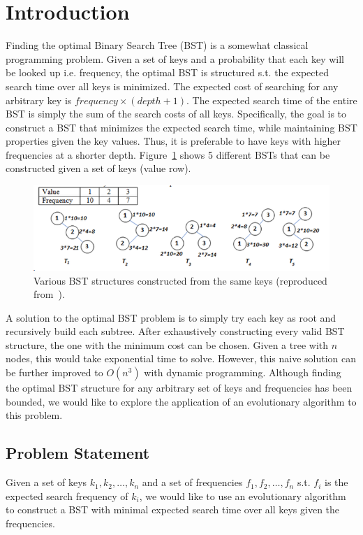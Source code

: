 
\section{Introduction}

Finding the optimal Binary Search Tree (BST) is a somewhat classical programming problem. Given a set of keys and a probability that each key will be looked up i.e. frequency, the optimal BST is structured s.t. the expected search time over all keys is minimized. The expected cost of searching for any arbitrary key is $frequency \times (depth + 1)$. The expected search time of the entire BST is simply the sum of the search costs of all keys. Specifically, the goal is to construct a BST that minimizes the expected search time, while maintaining BST properties given the key values. Thus, it is preferable to have keys with higher frequencies at a shorter depth. Figure~\ref{fig:opt-bst} shows 5 different BSTs that can be constructed given a set of keys (value row).

\begin{figure}[h]
    \centering
    \includegraphics[width=0.9\columnwidth]{figures/opt_bst.png}
    \caption{ \small Various BST structures constructed from the same keys (reproduced from~\cite{bst_figure}).}
    \label{fig:opt-bst}
\end{figure}

A solution to the optimal BST problem is to simply try each key as root and recursively build each subtree. After exhaustively constructing every valid BST structure, the one with the minimum cost can be chosen. Given a tree with $n$ nodes, this would take exponential time to solve. However, this naive solution can be further improved to $O(n^3)$ with dynamic programming. Although finding the optimal BST structure for any arbitrary set of keys and frequencies has been bounded, we would like to explore the application of an evolutionary algorithm to this problem.

\subsection{Problem Statement}

Given a set of keys $k_1,k_2,\dots,k_n$ and a set of frequencies $f_1,f_2,\dots,f_n$ s.t. $f_i$ is the expected search frequency of $k_i$, we would like to use an evolutionary algorithm to construct a BST with minimal expected search time over all keys given the frequencies.
